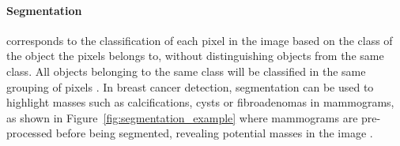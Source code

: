 \paragraph{Segmentation} corresponds to the classification of each pixel in the image based on the class of the object the pixels belongs to, without distinguishing objects from the same class. All objects belonging to the same class will be classified in the same grouping of pixels \cite{Geron2019}. In breast cancer detection, segmentation can be used to highlight masses such as calcifications, cysts or fibroadenomas \cite{breastcancerorg2018} in mammograms, as shown in Figure~\ref{fig:segmentation_example} where mammograms are pre-processed before being segmented, revealing potential masses in the image \cite{Pereira2014}.\\

